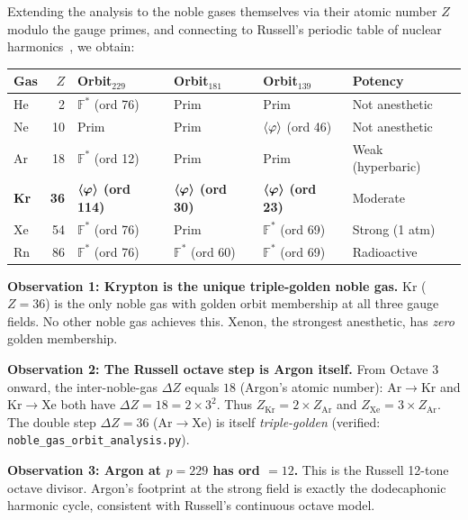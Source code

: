\begin{remark}
\label{rem:noble_gas_orbits}
Extending the analysis to the noble gases themselves via their atomic number $Z$ modulo the gauge primes, and connecting to Russell's periodic table of nuclear harmonics~\cite{Russell1926}, we obtain:

\begin{center}
{\small
\begin{tabular}{@{}lrllll@{}}
\toprule
\textbf{Gas} & $Z$ & \textbf{Orbit$_{229}$} & \textbf{Orbit$_{181}$} & \textbf{Orbit$_{139}$} & \textbf{Potency} \\
\midrule
He &  2 & $\mathbb{F}^*$ (ord 76)  & Prim & Prim & Not anesthetic \\
Ne & 10 & Prim                      & Prim & $\langle\varphi\rangle$ (ord 46) & Not anesthetic \\
Ar & 18 & $\mathbb{F}^*$ (ord 12)  & Prim & Prim & Weak (hyperbaric) \\
\textbf{Kr} & \textbf{36} & $\boldsymbol{\langle\varphi\rangle}$ \textbf{(ord 114)} & $\boldsymbol{\langle\varphi\rangle}$ \textbf{(ord 30)} & $\boldsymbol{\langle\varphi\rangle}$ \textbf{(ord 23)} & Moderate \\
Xe & 54 & $\mathbb{F}^*$ (ord 76)  & Prim & $\mathbb{F}^*$ (ord 69) & Strong (1 atm) \\
Rn & 86 & $\mathbb{F}^*$ (ord 76)  & $\mathbb{F}^*$ (ord 60) & $\mathbb{F}^*$ (ord 69) & Radioactive \\
\bottomrule
\end{tabular}
}
\end{center}

\textbf{Observation 1: Krypton is the unique triple-golden noble gas.} Kr ($Z = 36$) is the only noble gas with golden orbit membership at all three gauge fields. No other noble gas achieves this. Xenon, the strongest anesthetic, has \emph{zero} golden membership.

\textbf{Observation 2: The Russell octave step is Argon itself.} From Octave 3 onward, the inter-noble-gas $\Delta Z$ equals $18$ (Argon's atomic number): Ar$\to$Kr and Kr$\to$Xe both have $\Delta Z = 18 = 2 \times 3^2$. Thus $Z_{\mathrm{Kr}} = 2 \times Z_{\mathrm{Ar}}$ and $Z_{\mathrm{Xe}} = 3 \times Z_{\mathrm{Ar}}$. The double step $\Delta Z = 36$ (Ar$\to$Xe) is itself \emph{triple-golden} (verified: \texttt{noble\_gas\_orbit\_analysis.py}).

\textbf{Observation 3: Argon at $p = 229$ has ord $= 12$.} This is the Russell 12-tone octave divisor. Argon's footprint at the strong field is exactly the dodecaphonic harmonic cycle, consistent with Russell's continuous octave model.


\end{remark}

